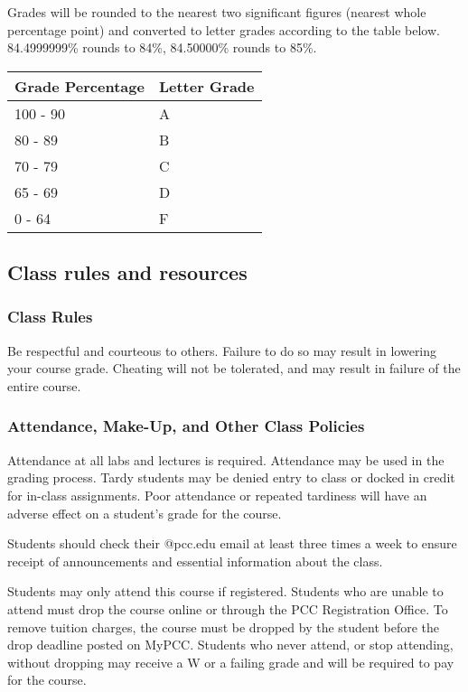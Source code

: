 \documentclass[11pt]{article}
\begin{document}
Grades will be rounded to the nearest two significant figures (nearest
whole percentage point) and converted to letter grades according to the
table below. 84.4999999\% rounds to 84\%, 84.50000\% rounds to 85\%.

\begin{longtable}[]{@{}ll@{}}
\toprule
Grade Percentage & Letter Grade\tabularnewline
\midrule
\endhead
100 - 90 & A\tabularnewline
80 - 89 & B\tabularnewline
70 - 79 & C\tabularnewline
65 - 69 & D\tabularnewline
0 - 64 & F\tabularnewline
\bottomrule
\end{longtable}

    \hypertarget{class-rules-and-resources}{%
\subsection{Class rules and resources}\label{class-rules-and-resources}}

\hypertarget{class-rules}{%
\subsubsection{Class Rules}\label{class-rules}}

Be respectful and courteous to others. Failure to do so may result in
lowering your course grade. Cheating will not be tolerated, and may
result in failure of the entire course.

\hypertarget{attendance-make-up-and-other-class-policies}{%
\subsubsection{Attendance, Make-Up, and Other Class
Policies}\label{attendance-make-up-and-other-class-policies}}

Attendance at all labs and lectures is required. Attendance may be used
in the grading process. Tardy students may be denied entry to class or
docked in credit for in-class assignments. Poor attendance or repeated
tardiness will have an adverse effect on a student's grade for the
course.

Students should check their @pcc.edu email at least three times a week
to ensure receipt of announcements and essential information about the
class.

Students may only attend this course if registered. Students who are
unable to attend must drop the course online or through the PCC
Registration Office. To remove tuition charges, the course must be
dropped by the student before the drop deadline posted on MyPCC.
Students who never attend, or stop attending, without dropping may
receive a W or a failing grade and will be required to pay for the
course.
\end{document}
